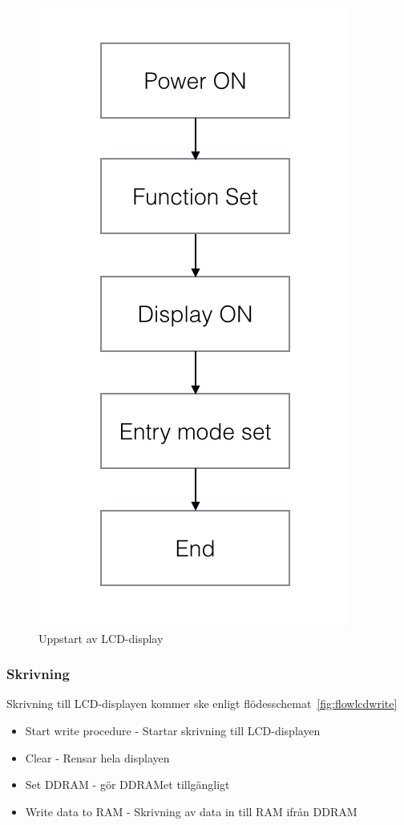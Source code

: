 \documentclass[a4paper,12pt,fleqn]{article}
\begin{document}
\begin{figure}[htp]
	  \begin{center}
	  \includegraphics[keepaspectratio=true,width=0.4\linewidth]{bilder/startup}  %
	  \end{center}
	  \caption{Uppstart av LCD-display} %
	  \label{fig:flowlcdstart}
	\end{figure}

\newpage


\subsubsection{Skrivning}

Skrivning till LCD-displayen kommer ske enligt flödesschemat~\ref{fig:flowlcdwrite}
\begin{itemize}
  \item Start write procedure - Startar skrivning till LCD-displayen
  \item Clear - Rensar hela displayen
  \item Set DDRAM - gör DDRAMet tillgängligt
  \item Write data to RAM - Skrivning av data in till RAM ifrån DDRAM
\end{itemize}
\end{document}
